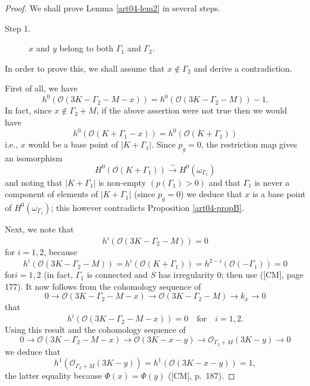 \begin{proof}
We shall prove Lemma \ref{art04-lem2} in several steps.
\begin{description}
\item[Step 1.] $x$ and $y$ belong to both $\Gamma_{1}$ and $\Gamma_{2}$.
\end{description}

In order to prove this, we shall assume that $x\not\in \Gamma_{2}$ and
derive a contradiction.

First of all, we have
$$
h^{0}(\mathscr{O}(3K-\Gamma_{2}-M-x))=h^{0}(\mathscr{O}(3K-\Gamma_{2}-M))-1.
$$
In fact, since $x\not\in \Gamma_{2}+M$, if the above assertion were
not true then we would have
$$
h^{0}(\mathscr{O}(K+\Gamma_{1}-x))=h^{0}(\mathscr{O}(K+\Gamma_{1}))
$$
i.e., $x$ would be a base point of $|K+\Gamma_{1}|$. Since $p_{g}=0$,
the restriction map gives an isomorphism
$$
H^{0}(\mathscr{O}(K+\Gamma_{1}))\xrightarrow{\sim}H^{0}(\omega_{\Gamma_{1}})
$$
and noting that $|K+\Gamma_{1}|$ is non-empty $(p(\Gamma_{1})>0)$ and
that $\Gamma_{1}$ is never a component of elements of $|K+\Gamma_{1}|$
(since $p_{g}=0$) we deduce that $x$ is a base point of
$H^{0}(\omega_{\Gamma_{1}})$; this however contradicts
Proposition \ref{art04-propB}.

Next, we note that
$$
h^{i}(\mathscr{O}(3K-\Gamma_{2}-M))=0
$$
for $i=1,2$, because
$$
h^{i}(\mathscr{O}(3K-\Gamma_{2}-M))=h^{i}(\mathscr{O}(K+\Gamma_{1}))=h^{2-i}(\mathscr{O}(-\Gamma_{1}))=0 
$$
for\pageoriginale $i=1,2$ (in fact, $\Gamma_{1}$ is connected and $S$
has irregularity $0$; then use ([CM], page 177). It now
follows from the cohomology sequence of
$$
0\to \mathscr{O}(3K-\Gamma_{2}-M-x)\to \mathscr{O}(3K-\Gamma_{2}-M)\to
k_{x}\to 0
$$
that
$$
h^{i}(\mathscr{O}(3K-\Gamma_{2}-M-x))=0\quad\text{for}\quad i=1,2.
$$
Using this result and the cohomology sequence of
$$
0\to \mathscr{O}(3K-\Gamma_{2}-M-x)\to \mathscr{O}(3K-x-y)\to \mathscr{O}_{\Gamma_{2}+M}(3K-y)\to 0
$$
we deduce that
$$
h^{1}(\mathscr{O}_{\Gamma_{2}+M}(3K-y))=h^{1}(\mathscr{O}(3K-x-y))=1,
$$
the latter equality because $\Phi(x)=\Phi(y)$
([CM], p.~187). 


\end{proof}
